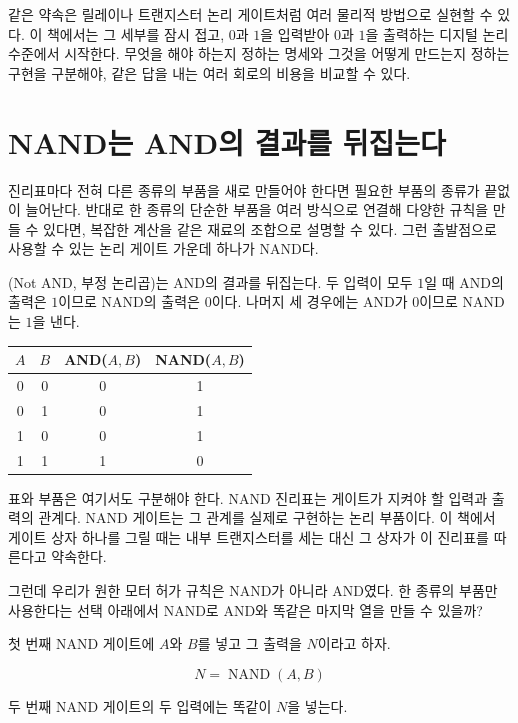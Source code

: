 같은 약속은 릴레이나 트랜지스터 논리 게이트처럼 여러 물리적 방법으로 실현할 수 있다. 이 책에서는 그 세부를 잠시 접고, \(0\)과 \(1\)을 입력받아 \(0\)과 \(1\)을 출력하는 디지털 논리 수준에서 시작한다. 무엇을 해야 하는지 정하는 명세와 그것을 어떻게 만드는지 정하는 구현을 구분해야, 같은 답을 내는 여러 회로의 비용을 비교할 수 있다.

\section{NAND는 AND의 결과를 뒤집는다}

진리표마다 전혀 다른 종류의 부품을 새로 만들어야 한다면 필요한 부품의 종류가 끝없이 늘어난다. 반대로 한 종류의 단순한 부품을 여러 방식으로 연결해 다양한 규칙을 만들 수 있다면, 복잡한 계산을 같은 재료의 조합으로 설명할 수 있다. 그런 출발점으로 사용할 수 있는 논리 게이트 가운데 하나가 NAND다\parencite{nand2tetrisproject1}.

(Not AND, 부정 논리곱)는 AND의 결과를 뒤집는다. 두 입력이 모두 \(1\)일 때 AND의 출력은 \(1\)이므로 NAND의 출력은 \(0\)이다. 나머지 세 경우에는 AND가 \(0\)이므로 NAND는 \(1\)을 낸다.

\begin{center}
\small
\begin{tabular}{cccc}
\toprule
\sffamily\bfseries \(A\) & \sffamily\bfseries \(B\) & \sffamily\bfseries AND(\(A,B\)) & \sffamily\bfseries NAND(\(A,B\)) \\
\midrule
0 & 0 & 0 & 1 \\
0 & 1 & 0 & 1 \\
1 & 0 & 0 & 1 \\
1 & 1 & 1 & 0 \\
\bottomrule
\end{tabular}
\end{center}

표와 부품은 여기서도 구분해야 한다. NAND 진리표는 게이트가 지켜야 할 입력과 출력의 관계다. NAND 게이트는 그 관계를 실제로 구현하는 논리 부품이다. 이 책에서 게이트 상자 하나를 그릴 때는 내부 트랜지스터를 세는 대신 그 상자가 이 진리표를 따른다고 약속한다.

그런데 우리가 원한 모터 허가 규칙은 NAND가 아니라 AND였다. 한 종류의 부품만 사용한다는 선택 아래에서 NAND로 AND와 똑같은 마지막 열을 만들 수 있을까?

첫 번째 NAND 게이트에 \(A\)와 \(B\)를 넣고 그 출력을 \(N\)이라고 하자.

\[
  N=\operatorname{NAND}(A,B)
\]

두 번째 NAND 게이트의 두 입력에는 똑같이 \(N\)을 넣는다.

